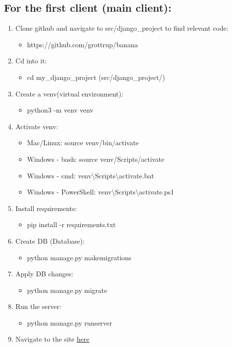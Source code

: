 \documentclass{article}
\begin{document}
\subsection*{For the first client (main client):}
\begin{enumerate}
    \item Clone github and navigate to src/django\_project to find relevant code:
    \begin{itemize}
        \item https://github.com/grottrup/banana
    \end{itemize}
    \item Cd into it:
    \begin{itemize}
        \item cd my\_django\_project (src/django\_project/)
    \end{itemize}
    \item Create a venv(virtual environment):
    \begin{itemize}
        \item python3 -m venv venv
    \end{itemize}
    \item Activate venv:
    \begin{itemize}
        \item Mac/Linux: source venv/bin/activate
        \item Windows - bash: source venv/Scripts/activate
        \item Windows - cmd: venv\textbackslash{}Scripts\textbackslash{}activate.bat
        \item Windows - PowerShell: venv\textbackslash{}Scripts\textbackslash{}activate.ps1
    \end{itemize}
    \item Install requirements:
    \begin{itemize}
        \item pip install -r requirements.txt
    \end{itemize}
    \item Create DB (Database):
    \begin{itemize}
        \item python manage.py makemigrations
    \end{itemize}
    \item Apply DB changes:
    \begin{itemize}
        \item python manage.py migrate
    \end{itemize}
    \item Run the server:
    \begin{itemize}
        \item python manage.py runserver
    \end{itemize}
    \item Navigate to the site \href{http://127.0.0.1:8000}{\underline{here}}
\end{enumerate}
\newpage
\end{document}
